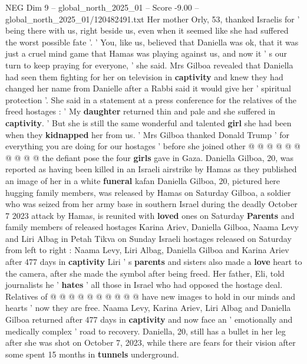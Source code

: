 \begin{textsample}{NEG Dim 9 – global\_north\_2025\_01 – Score -9.00 – global\_north\_2025\_01/120482491.txt}  \label{ex:f9_neg_025}
Her mother Orly, 53, thanked Israelis for ' being there with us, right beside us, even when it seemed like she had suffered the worst possible fate '. ' You, like us, believed that Daniella was ok, that it was just a cruel mind game that Hamas was playing against us, and now it ' s our turn to keep praying for everyone, ' she said.
Mrs Gilboa revealed that Daniella had seen them fighting for her on television in \textbf{captivity} and knew they had changed her name from Danielle after a Rabbi said it would give her ' spiritual protection '.
She said in a statement at a press conference for the relatives of the freed hostages : ' My \textbf{daughter} returned thin and pale and she suffered in \textbf{captivity}. ' But she is still the same wonderful and talented \textbf{girl} she had been when they \textbf{kidnapped} her from us. ' Mrs Gilboa thanked Donald Trump ' for everything you are doing for our hostages ' before she joined other @ @ @ @ @ @ @ @ @ @ the defiant pose the four \textbf{girls} gave in Gaza.
Daniella Gilboa, 20, was reported as having been killed in an Israeli airstrike by Hamas as they published an image of her in a white \textbf{funeral} kafan Daniella Gilboa, 20, pictured here hugging family members, was released by Hamas on Saturday Gilboa, a soldier who was seized from her army base in southern Israel during the deadly October 7 2023 attack by Hamas, is reunited with \textbf{loved} ones on Saturday \textbf{Parents} and family members of released hostages Karina Ariev, Daniella Gilboa, Naama Levy and Liri Albag in Petah Tikva on Sunday Israeli hostages released on Saturday from left to right : Naama Levy, Liri Albag, Daniella Gilboa and Karina Ariev after 477 days in \textbf{captivity} Liri ' s \textbf{parents} and sisters also made a \textbf{love} heart to the camera, after she made the symbol after being freed.
Her father, Eli, told journalists he ' \textbf{hates} ' all those in Israel who had opposed the hostage deal.
Relatives of @ @ @ @ @ @ @ @ @ @ have new images to hold in our minds and hearts ' now they are free.
Naama Levy, Karina Ariev, Liri Albag and Daniella Gilboa returned after 477 days in \textbf{captivity} and now face an ' emotionally and medically complex ' road to recovery.
Daniella, 20, still has a bullet in her leg after she was shot on October 7, 2023, while there are fears for their vision after some spent 15 months in \textbf{tunnels} underground.

\end{textsample}
